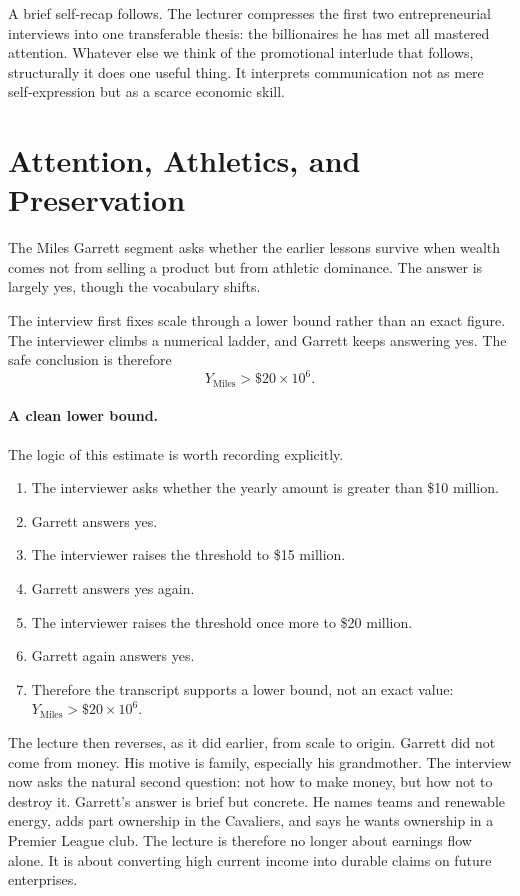 A brief self-recap follows. The lecturer compresses the first two entrepreneurial interviews into one transferable thesis: the billionaires he has met all mastered attention. Whatever else we think of the promotional interlude that follows, structurally it does one useful thing. It interprets communication not as mere self-expression but as a scarce economic skill.

\section{Attention, Athletics, and Preservation}

The Miles Garrett segment asks whether the earlier lessons survive when wealth comes not from selling a product but from athletic dominance. The answer is largely yes, though the vocabulary shifts.

The interview first fixes scale through a lower bound rather than an exact figure. The interviewer climbs a numerical ladder, and Garrett keeps answering yes. The safe conclusion is therefore
\begin{equation}
Y_{\text{Miles}} > \$20 \times 10^6.
\end{equation}

\paragraph{A clean lower bound.}
The logic of this estimate is worth recording explicitly.
\begin{enumerate}
\item The interviewer asks whether the yearly amount is greater than \$10 million.
\item Garrett answers yes.
\item The interviewer raises the threshold to \$15 million.
\item Garrett answers yes again.
\item The interviewer raises the threshold once more to \$20 million.
\item Garrett again answers yes.
\item Therefore the transcript supports a lower bound, not an exact value: \(Y_{\text{Miles}} > \$20 \times 10^6\).
\end{enumerate}

The lecture then reverses, as it did earlier, from scale to origin. Garrett did not come from money. His motive is family, especially his grandmother. The interview now asks the natural second question: not how to make money, but how not to destroy it. Garrett's answer is brief but concrete. He names teams and renewable energy, adds part ownership in the Cavaliers, and says he wants ownership in a Premier League club. The lecture is therefore no longer about earnings flow alone. It is about converting high current income into durable claims on future enterprises.

